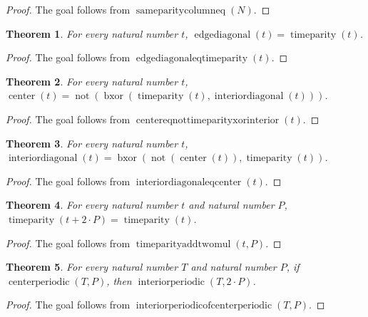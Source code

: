 \documentclass[11pt]{article}
\newtheorem{theorem}{Theorem}[section]
\theoremstyle{definition}
\begin{document}
\begin{proof}
The goal follows from \(\operatorname{sameparitycolumneq}(N)\).
\end{proof}
\begin{theorem}
\label{ll:observations:edge-diagonal-eq-time-parity}
For every natural number \(t\), \(\operatorname{edgediagonal}(t) = \operatorname{timeparity}(t)\).
\end{theorem}
\begin{proof}
The goal follows from \(\operatorname{edgediagonaleqtimeparity}(t)\).
\end{proof}
\begin{theorem}
\label{ll:observations:center-eq-not-time-parity-xor-interior}
For every natural number \(t\), \(\operatorname{center}(t) = \operatorname{not}(\operatorname{bxor}(\operatorname{timeparity}(t), \operatorname{interiordiagonal}(t)))\).
\end{theorem}
\begin{proof}
The goal follows from \(\operatorname{centereqnottimeparityxorinterior}(t)\).
\end{proof}
\begin{theorem}
\label{ll:observations:interior-diagonal-eq-center}
For every natural number \(t\), \(\operatorname{interiordiagonal}(t) = \operatorname{bxor}(\operatorname{not}(\operatorname{center}(t)), \operatorname{timeparity}(t))\).
\end{theorem}
\begin{proof}
The goal follows from \(\operatorname{interiordiagonaleqcenter}(t)\).
\end{proof}
\begin{theorem}
\label{ll:observations:time-parity-add-two-mul}
For every natural number \(t\) and natural number \(P\), \(\operatorname{timeparity}(t + 2 \cdot P) = \operatorname{timeparity}(t)\).
\end{theorem}
\begin{proof}
The goal follows from \(\operatorname{timeparityaddtwomul}(t, P)\).
\end{proof}
\begin{theorem}
\label{ll:observations:interior-periodic-of-center-periodic}
For every natural number \(T\) and natural number \(P\), if \(\operatorname{centerperiodic}(T, P)\), then \(\operatorname{interiorperiodic}(T, 2 \cdot P)\).
\end{theorem}
\begin{proof}
The goal follows from \(\operatorname{interiorperiodicofcenterperiodic}(T, P)\).
\end{proof}
\end{document}
